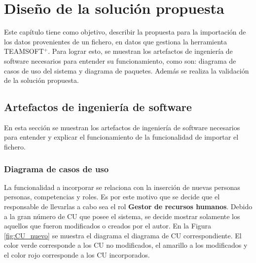 \chapter{Diseño de la solución propuesta} \label{chap:3}

Este capítulo tiene como objetivo, describir la propuesta para la importación de los datos provenientes de un fichero, en datos que gestiona la herramienta TEAMSOFT$^+$. Para lograr esto, se muestran los artefactos de ingeniería de software necesarios para entender su funcionamiento, como son: diagrama de casos de uso del sistema y diagrama de paquetes. Además se realiza la validación de la solución propuesta.

\section{Artefactos de ingeniería de software}

En esta sección se muestran los artefactos de ingeniería de software necesarios para entender y explicar el funcionamiento de la funcionalidad de importar el fichero.

\subsection{Diagrama de casos de uso}

La funcionalidad a incorporar se relaciona con la inserción de nuevas personas personas, competencias y roles. Es por este motivo que se decide que el responsable de llevarlas a cabo sea el rol \textbf{Gestor de recursos humanos}. Debido a la gran número de CU que posee el sistema, se decide mostrar solamente los aquellos que fueron modificados o creados por el autor. En la Figura \ref{fig:CU_nuevo} se muestra el diagrama el diagrama de CU correspondiente. El color verde corresponde a los CU no modificados, el amarillo a los modificados y el color rojo corresponde a los CU incorporados.


